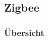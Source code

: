 \vspace*{4cm}
\begin{center}
\part{Zigbee}
\end{center}
\vspace*{\fill}
\clearpage

\section{Übersicht}\label{sec:Uebersicht}







